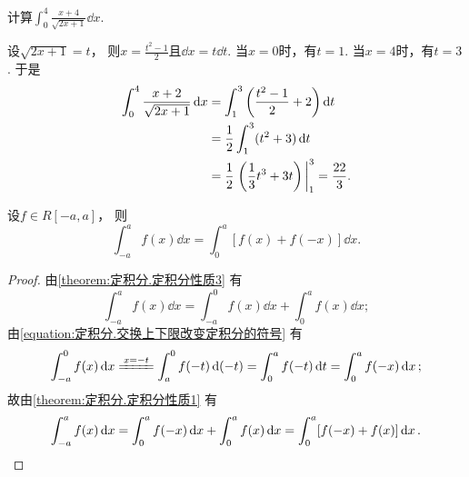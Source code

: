 \begin{example}
计算\(\int_0^4 \frac{x+4}{\sqrt{2x+1}} \dd{x}\).
\begin{solution}
设\(\sqrt{2x+1}=t\)，
则\(x=\frac{t^2-1}2\)且\(\dd{x}=t\dd{t}\).
当\(x=0\)时，有\(t=1\).
当\(x=4\)时，有\(t=3\).
于是\begin{align*}
	\int_0^4 \frac{x+2}{\sqrt{2x+1}} \dd{x}
	&= \int_1^3 \left(\frac{t^2-1}2+2\right) \dd{t} \\
	&= \frac12 \int_1^3 (t^2+3) \dd{t} \\
	&= \frac12 \eval{\left(\frac13 t^3 + 3t\right)}_1^3
	= \frac{22}3.
\end{align*}
\end{solution}
\end{example}

\begin{proposition}\label{theorem:定积分.利用对称性简化计算0}
设\(f \in R[-a,a]\)，
则\begin{equation}
	\int_{-a}^a f(x) \dd{x} = \int_0^a [f(x) + f(-x)] \dd{x}.
\end{equation}
\begin{proof}
由\cref{theorem:定积分.定积分性质3} 有\[
	\int_{-a}^a f(x) \dd{x}
	= \int_{-a}^0 f(x) \dd{x}
	+ \int_0^a f(x) \dd{x};
\]
由\cref{equation:定积分.交换上下限改变定积分的符号} 有\[
	\int_{-a}^0 f(x) \dd{x}
	\xlongequal{x=-t} \int_a^0 f(-t) \dd(-t)
	= \int_0^a f(-t) \dd{t}
	= \int_0^a f(-x) \dd{x};
\]
故由\cref{theorem:定积分.定积分性质1} 有\[
	\int_{-a}^a f(x) \dd{x}
	= \int_0^a f(-x) \dd{x} + \int_0^a f(x) \dd{x}
	= \int_0^a [f(-x) + f(x)] \dd{x}.
	\qedhere
\]
\end{proof}
\end{proposition}

